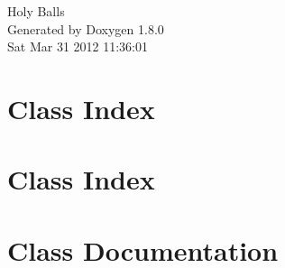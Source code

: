 \documentclass{book}
\begin{document}
\hypersetup{pageanchor=false,citecolor=blue}
\begin{titlepage}
\vspace*{7cm}
\begin{center}
{\Large Holy Balls }\\
\vspace*{1cm}
{\large Generated by Doxygen 1.8.0}\\
\vspace*{0.5cm}
{\small Sat Mar 31 2012 11:36:01}\\
\end{center}
\end{titlepage}
\clearemptydoublepage
{}
\tableofcontents
\clearemptydoublepage
{}
\hypersetup{pageanchor=true,citecolor=blue}
\chapter{Class Index}

\chapter{Class Index}

\chapter{Class Documentation}














































\printindex
\end{document}
